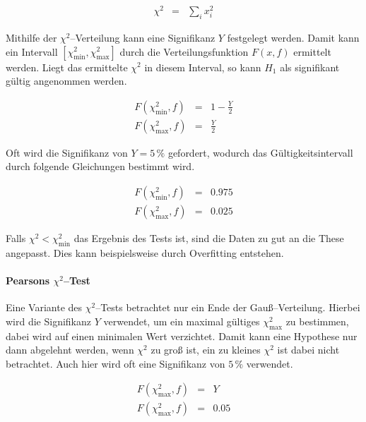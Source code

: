 \documentclass[12pt,a4paper]{scrartcl}
\numberwithin{equation}{section} %
\begin{document}
\begin{eqnarray}
    \chi^2 &=& \sum_i x_i^2
\end{eqnarray}

Mithilfe der $\chi^2$--Verteilung kann eine Signifikanz $Y$ festgelegt werden. Damit kann ein Intervall $[\chi^2_\mathrm{min}, \chi^2_\mathrm{max}]$ durch die Verteilungsfunktion $F(x, f)$ ermittelt werden. Liegt das ermittelte $\chi^2$ in diesem Interval, so kann $H_1$ als signifikant gültig angenommen werden.

\begin{eqnarray}
    F(\chi^2_\mathrm{min}, f) &=& 1 - \frac{Y}{2} \\
    F(\chi^2_\mathrm{max}, f) &=& \frac{Y}{2}
\end{eqnarray}

Oft wird die Signifikanz von $Y=5\,\%$ gefordert, wodurch das Gültigkeitsintervall durch folgende Gleichungen bestimmt wird.

\begin{eqnarray}
    F(\chi^2_\mathrm{min}, f) &=& 0.975 \label{eq:ChiMinFormula} \\
    F(\chi^2_\mathrm{max}, f) &=& 0.025 \label{eq:ChiMaxFormula}
\end{eqnarray}

Falls $\chi^2<\chi^2_\mathrm{min}$ das Ergebnis des Tests ist, sind die Daten zu gut an die These angepasst. Dies kann beispielsweise durch Overfitting entstehen.

\hypertarget{pearsons-chi2test}{%
\paragraph{\texorpdfstring{Pearsons
$\chi^2$--Test}{Pearsons \textbackslash chi\^{}2--Test}}\label{pearsons-chi2test}}

Eine Variante des $\chi^2$--Tests betrachtet nur ein Ende der Gauß--Verteilung. Hierbei wird die Signifikanz $Y$ verwendet, um ein maximal gültiges $\chi_\mathrm{max}^2$ zu bestimmen, dabei wird auf einen minimalen Wert verzichtet. \cite{McHugh} Damit kann eine Hypothese nur dann abgelehnt werden, wenn $\chi^2$ zu groß ist, ein zu kleines $\chi^2$ ist dabei nicht betrachtet. Auch hier wird oft eine Signifikanz von $5\,\%$ verwendet.

\begin{eqnarray}
    F(\chi^2_\mathrm{max}, f) &=& Y \\
    F(\chi^2_\mathrm{max}, f) &=& 0.05 \label{eq:ChiMaxPearson} \\
\end{eqnarray}
\end{document}
